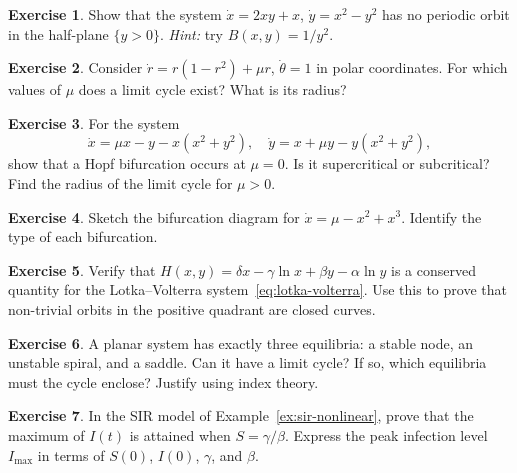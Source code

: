 \documentclass[12pt,a4paper,openany]{book}
\theoremstyle{definition}
\newtheorem{exercise}{Exercise}[chapter]
\theoremstyle{plain}
\theoremstyle{remark}
\begin{document}
\begin{exercise}
\label{exer:dulac-exercise}
Show that the system $\dot{x}=2xy+x$, $\dot{y}=x^{2}-y^{2}$ has no
periodic orbit in the half-plane $\{y>0\}$. \textit{Hint:} try
$B(x,y)=1/y^{2}$.
\end{exercise}

\begin{exercise}
\label{exer:pb-exercise}
Consider $\dot{r}=r(1-r^{2})+\mu r$, $\dot{\theta}=1$ in polar
coordinates. For which values of $\mu$ does a limit cycle exist?
What is its radius?
\end{exercise}

\begin{exercise}
\label{exer:hopf-exercise}
For the system
\[
  \dot{x} = \mu x - y - x(x^{2}+y^{2}),\quad
  \dot{y} = x + \mu y - y(x^{2}+y^{2}),
\]
show that a Hopf bifurcation occurs at $\mu=0$. Is it supercritical
or subcritical? Find the radius of the limit cycle for $\mu>0$.
\end{exercise}

\begin{exercise}
\label{exer:bifurcation-diagram}
Sketch the bifurcation diagram for $\dot{x}=\mu-x^{2}+x^{3}$.
Identify the type of each bifurcation.
\end{exercise}

\begin{exercise}
\label{exer:lotka-volterra-conserved}
Verify that $H(x,y)=\delta x-\gamma\ln x+\beta y-\alpha\ln y$ is a
conserved quantity for the Lotka--Volterra
system~\eqref{eq:lotka-volterra}. Use this to prove that non-trivial
orbits in the positive quadrant are closed curves.
\end{exercise}

\begin{exercise}
\label{exer:index-exercise}
A planar system has exactly three equilibria: a stable node, an
unstable spiral, and a saddle. Can it have a limit cycle? If so,
which equilibria must the cycle enclose? Justify using index theory.
\end{exercise}

\begin{exercise}
\label{exer:sir-R0}
In the SIR model of Example~\ref{ex:sir-nonlinear}, prove that the
maximum of $I(t)$ is attained when $S=\gamma/\beta$. Express the
peak infection level $I_{\max}$ in terms of $S(0)$, $I(0)$,
$\gamma$, and $\beta$.
\end{exercise}

\end{document}
